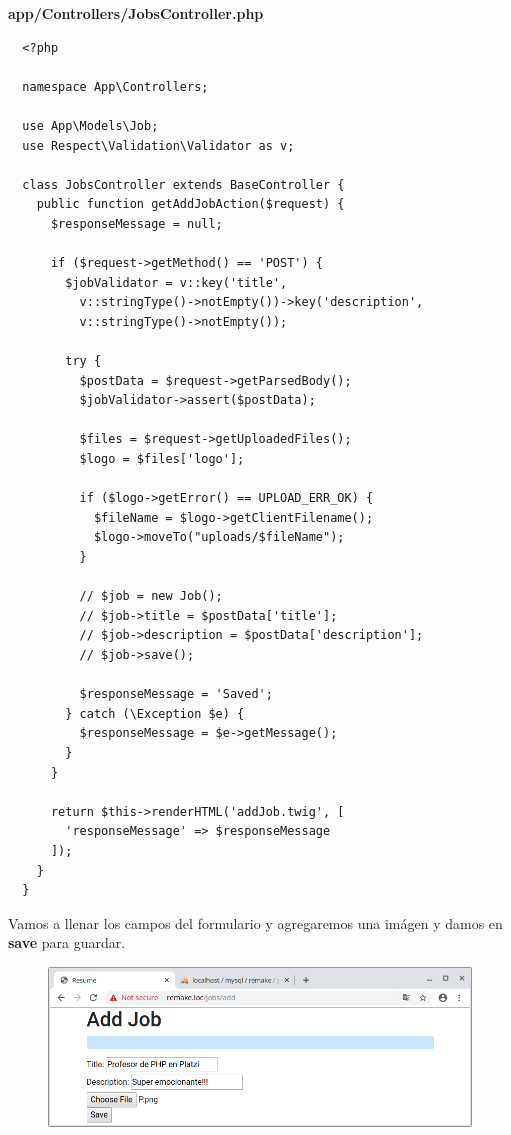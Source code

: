 \documentclass{article}
\begin{document}
\newpage

\textbf{app/Controllers/JobsController.php}
\begin{verbatim}
  <?php

  namespace App\Controllers;

  use App\Models\Job;
  use Respect\Validation\Validator as v;

  class JobsController extends BaseController {
    public function getAddJobAction($request) {
      $responseMessage = null;

      if ($request->getMethod() == 'POST') {
        $jobValidator = v::key('title',
          v::stringType()->notEmpty())->key('description',
          v::stringType()->notEmpty());

        try {
          $postData = $request->getParsedBody();
          $jobValidator->assert($postData);

          $files = $request->getUploadedFiles();
          $logo = $files['logo'];

          if ($logo->getError() == UPLOAD_ERR_OK) {
            $fileName = $logo->getClientFilename();
            $logo->moveTo("uploads/$fileName");
          }

          // $job = new Job();
          // $job->title = $postData['title'];
          // $job->description = $postData['description'];
          // $job->save();

          $responseMessage = 'Saved';
        } catch (\Exception $e) {
          $responseMessage = $e->getMessage();
        }
      }

      return $this->renderHTML('addJob.twig', [
        'responseMessage' => $responseMessage
      ]);
    }
  }
\end{verbatim}

\newpage

Vamos a llenar los campos del formulario y agregaremos una imágen y damos en
\textbf{save} para guardar.
\begin{figure}[h!]
  \centering
  \includegraphics[scale=0.5]{./Pictures/179_save_files.png}
\end{figure}
\end{document}
